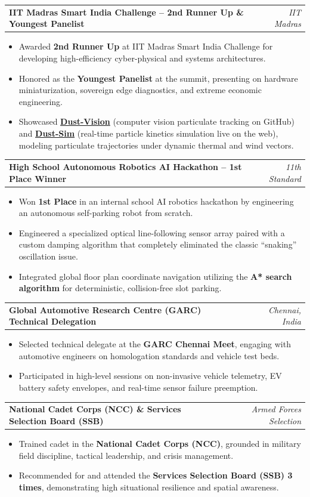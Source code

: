 \documentclass[letterpaper,10pt]{article}
\makeatletter
\newcommand{\resumeProjectHeading}[2]{
  \vspace{-2pt}\item
    \begin{tabular*}{\linewidth}[t]{l@{\extracolsep{\fill}}r}
      \textbf{#1} & \textit{\small #2} \\
    \end{tabular*}\vspace{-3pt}
}
\newcommand{\resumeItemListStart}{\begin{itemize}[leftmargin=14pt, labelsep=4pt, itemsep=0.5pt, parsep=0pt]}
\newcommand{\resumeItemListEnd}{\end{itemize}\vspace{-3pt}}
\makeatother
\begin{document}
    \resumeProjectHeading
      {IIT Madras Smart India Challenge -- 2nd Runner Up \& Youngest Panelist}{IIT Madras}
      \resumeItemListStart
        \item{Awarded \textbf{2nd Runner Up} at IIT Madras Smart India Challenge for developing high-efficiency cyber-physical and systems architectures.}
        \item{Honored as the \textbf{Youngest Panelist} at the summit, presenting on hardware miniaturization, sovereign edge diagnostics, and extreme economic engineering.}
        \item{Showcased \textbf{\href{https://github.com/seeramsujay/dust-vision}{Dust-Vision}} (computer vision particulate tracking on GitHub) and \textbf{\href{https://dust-sim.vercel.app}{Dust-Sim}} (real-time particle kinetics simulation live on the web), modeling particulate trajectories under dynamic thermal and wind vectors.}
      \resumeItemListEnd

    \resumeProjectHeading
      {High School Autonomous Robotics AI Hackathon -- 1st Place Winner}{11th Standard}
      \resumeItemListStart
        \item{Won \textbf{1st Place} in an internal school AI robotics hackathon by engineering an autonomous self-parking robot from scratch.}
        \item{Engineered a specialized optical line-following sensor array paired with a custom damping algorithm that completely eliminated the classic ``snaking'' oscillation issue.}
        \item{Integrated global floor plan coordinate navigation utilizing the \textbf{A* search algorithm} for deterministic, collision-free slot parking.}
      \resumeItemListEnd

    \resumeProjectHeading
      {Global Automotive Research Centre (GARC) Technical Delegation}{Chennai, India}
      \resumeItemListStart
        \item{Selected technical delegate at the \textbf{GARC Chennai Meet}, engaging with automotive engineers on homologation standards and vehicle test beds.}
        \item{Participated in high-level sessions on non-invasive vehicle telemetry, EV battery safety envelopes, and real-time sensor failure preemption.}
      \resumeItemListEnd

    \resumeProjectHeading
      {National Cadet Corps (NCC) \& Services Selection Board (SSB)}{Armed Forces Selection}
      \resumeItemListStart
        \item{Trained cadet in the \textbf{National Cadet Corps (NCC)}, grounded in military field discipline, tactical leadership, and crisis management.}
        \item{Recommended for and attended the \textbf{Services Selection Board (SSB) 3 times}, demonstrating high situational resilience and spatial awareness.}
      \resumeItemListEnd
\end{document}
